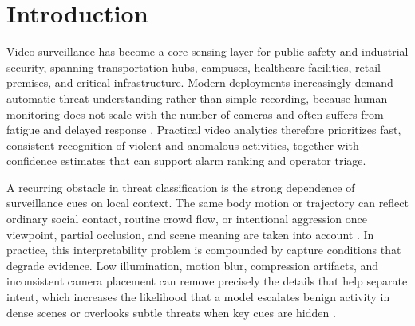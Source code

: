 \documentclass[AMA,Times1COL]{WileyNJDv5} %
\begin{document}


\maketitle

\renewcommand\thefootnote{}
\renewcommand\thefootnote{\fnsymbol{footnote}}
\setcounter{footnote}{1}

\section{Introduction}

Video surveillance has become a core sensing layer for public safety and industrial security, spanning transportation hubs, campuses, healthcare facilities, retail premises, and critical infrastructure. Modern deployments increasingly demand automatic threat understanding rather than simple recording, because human monitoring does not scale with the number of cameras and often suffers from fatigue and delayed response \cite{b1}. Practical video analytics therefore prioritizes fast, consistent recognition of violent and anomalous activities, together with confidence estimates that can support alarm ranking and operator triage.

A recurring obstacle in threat classification is the strong dependence of surveillance cues on local context. The same body motion or trajectory can reflect ordinary social contact, routine crowd flow, or intentional aggression once viewpoint, partial occlusion, and scene meaning are taken into account \cite{b2}. In practice, this interpretability problem is compounded by capture conditions that degrade evidence. Low illumination, motion blur, compression artifacts, and inconsistent camera placement can remove precisely the details that help separate intent, which increases the likelihood that a model escalates benign activity in dense scenes or overlooks subtle threats when key cues are hidden \cite{b3}.
\end{document}
